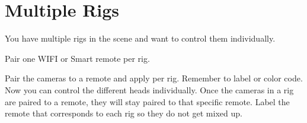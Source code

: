 \chapter{Multiple Rigs}
\pagecolor{white}
\label{chap:10}
\begin{fullwidth}


\problem

{\large You have multiple rigs in the scene and want to control them individually.
 \par}

\solution

{\large Pair one WIFI or Smart remote per rig. 
 \par}

Pair the cameras to a remote and apply per rig. Remember to label or color code. Now you can control the different heads individually. Once the cameras in a rig are paired to a remote, they will stay paired to that specific remote. Label the remote that corresponds to each rig so they do not get mixed up. 





\clearpage
\end{fullwidth}
